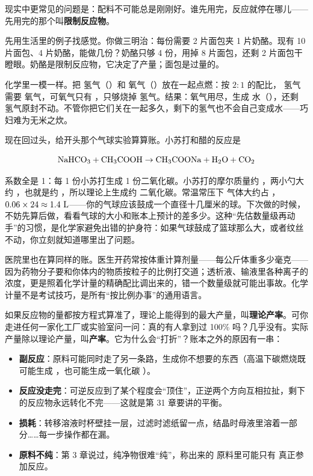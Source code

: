 现实中更常见的问题是：配料不可能总是刚刚好。谁先用完，反应就停在哪儿——先用完的那个叫\textbf{限制反应物}。

先用生活里的例子找感觉。你做三明治：每份需要 2 片面包夹 1 片奶酪。现有 10 片面包、4 片奶酪，能做几份？奶酪只够 4 份，用掉 8 片面包，还剩 2 片面包干瞪眼。奶酪是限制反应物，它决定了产量；面包是过量的。

化学里一模一样。把  氢气（）和  氧气（）放在一起点燃：按 $2:1$ 的配比， 氢气需要  氧气，可氧气只有 ，只够烧掉  氢气。结果：氧气用尽，生成  水（），还剩  氢气原封不动。不管你把它们关在一起多久，剩下的氢气也不会自己变成水——巧妇难为无米之炊。

现在回过头，给开头那个气球实验算算账。小苏打和醋的反应是

\[\mathrm{NaHCO_3} + \mathrm{CH_3COOH} \rightarrow \mathrm{CH_3COONa} + \mathrm{H_2O} + \mathrm{CO_2}\]

系数全是 1：每 1 份小苏打生成 1 份二氧化碳。小苏打的摩尔质量约 ，两小勺大约 ，也就是约 ，所以理论上生成约  二氧化碳。常温常压下  气体大约占 ，$0.06\times 24\approx1.4\ \mathrm{L}$——你的气球应该鼓成一个直径十几厘米的球。下次做的时候，不妨先算后做，看看气球的大小和账本上预计的差多少。这种“先估数量级再动手”的习惯，是化学家避免出错的护身符：如果气球鼓成了篮球那么大，或者纹丝不动，你立刻就知道哪里出了问题。

医院里也在算同样的账。医生开药常按体重计算剂量——每公斤体重多少毫克——因为药物分子要和你体内的物质按粒子的比例打交道；透析液、输液里各种离子的浓度，更是照着化学计量的精确配比调出来的，错一个数量级就可能出事故。化学计量不是考试技巧，是所有“按比例办事”的通用语言。

如果反应物的量都按方程式算准了，理论上能得到的最大产量，叫\textbf{理论产率}。可你走进任何一家化工厂或实验室问一问：真的有人拿到过 100\% 吗？几乎没有。实际产量除以理论产量，叫\textbf{产率}。它为什么会“打折”？账本之外的原因有一串：

\begin{itemize}[itemsep=2pt]
\item \textbf{副反应}：原料可能同时走了另一条路，生成你不想要的东西（高温下碳燃烧既可能生成 ，也可能生成一氧化碳 ）。
\item \textbf{反应没走完}：可逆反应到了某个程度会“顶住”，正逆两个方向互相拉扯，剩下的反应物永远转化不完——这就是第 31 章要讲的平衡。
\item \textbf{损耗}：转移溶液时杯壁挂一层，过滤时滤纸留一点，结晶时母液里溶着一部分……每一步操作都在漏。
\item \textbf{原料不纯}：第 3 章说过，纯净物很难“纯”，称出来的  原料里可能只有  真正参加反应。
\end{itemize}

